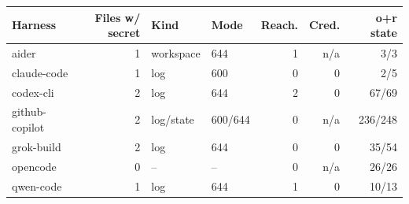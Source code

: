 \begin{tabular}{lrllrrr}
\toprule
Harness & Files w/ secret & Kind & Mode & Reach. & Cred. & o+r state \\
\midrule
aider & 1 & workspace & 644 & 1 & n/a & 3/3 \\
claude-code & 1 & log & 600 & 0 & 0 & 2/5 \\
codex-cli & 2 & log & 644 & 2 & 0 & 67/69 \\
github-copilot & 2 & log/state & 600/644 & 0 & n/a & 236/248 \\
grok-build & 2 & log & 644 & 0 & 0 & 35/54 \\
opencode & 0 & -- & -- & 0 & n/a & 26/26 \\
qwen-code & 1 & log & 644 & 1 & 0 & 10/13 \\
\bottomrule
\end{tabular}
